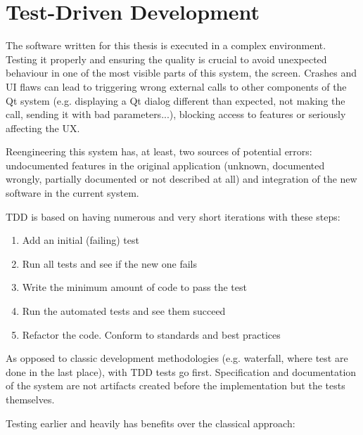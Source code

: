
\section{Test-Driven Development}
The software written for this thesis is executed in a complex environment.
Testing it properly and ensuring the quality is crucial to avoid unexpected behaviour in one of the most visible parts of this system, the screen.
Crashes and \ac{UI} flaws can lead to triggering wrong external calls to other components of the Qt system (e.g. displaying a Qt dialog different than expected, not making the call, sending it with bad parameters...), blocking access to features or seriously affecting the \ac{UX}.

Reengineering this system has, at least, two sources of potential errors: 
undocumented features in the original application (unknown, documented wrongly, partially documented or not described at all) and integration of the new software in the current system.

\ac{TDD} is based on having numerous and very short iterations with these steps:
\begin{enumerate}
    \item Add an initial (failing) test
    \item Run all tests and see if the new one fails
    \item Write the minimum amount of code to pass the test
    \item Run the automated tests and see them succeed
    \item Refactor the code. Conform to standards and best practices
\end{enumerate}

As opposed to classic development methodologies (e.g. waterfall, where test are done in the last place), with \ac{TDD} tests go first. 
Specification and documentation of the system are not artifacts created before the implementation but the tests themselves.

Testing earlier and heavily has benefits over the classical approach:

